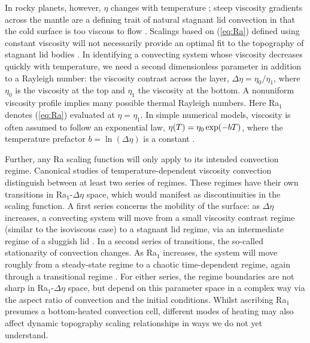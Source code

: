 In rocky planets, however, $\eta$ changes with temperature \citep{karato_rheology_1993}; steep viscosity gradients across the mantle are a defining trait of natural stagnant lid convection in that the cold surface is too viscous to flow \citep{davaille_transient_1993, solomatov_scaling_1995}. Scalings based on (\ref{eq:Ra}) defined using constant viscosity will not necessarily provide an optimal fit to the topography of stagnant lid bodies \citep{sembroni_impact_2017, bodur_impact_2019}. In identifying a convecting system whose viscosity decreases quickly with temperature, we need a second dimensionless parameter in addition to a Rayleigh number: the viscosity contrast across the layer, $\Delta \eta=\eta_0/\eta_1$, where $\eta_0$ is the viscosity at the top and $\eta_1$ the viscosity at the bottom. A nonuniform viscosity profile implies many possible thermal Rayleigh numbers. Here Ra$_1$ denotes (\ref{eq:Ra}) evaluated at $\eta=\eta_1$. In simple numerical models, viscosity is often assumed to follow an exponential law, $\eta(T) = \eta_0 \, {\rm exp}(-b T)$, where the temperature prefactor $b = \ln\left(\Delta \eta\right)$ is a constant \citep{solomatov_scaling_1995}. 

Further, any Ra scaling function will only apply to its intended convection regime. Canonical studies of temperature-dependent viscosity convection distinguish between at least two series of regimes. These regimes have their own transitions in Ra$_1$-$\Delta \eta$ space, which would manifest as discontinuities in the scaling function. %
A first series concerns the mobility of the surface: as $\Delta \eta$ increases, a convecting system will move from a small viscosity contrast regime (similar to the isoviscous case) to a stagnant lid regime, via an intermediate regime of a sluggish lid \citep{solomatov_scaling_1995, moresi_numerical_1995, kameyama_transitions_2000}. In a second series of transitions, the so-called stationarity of convection changes. As Ra$_1$ increases, the system will move roughly from a steady-state regime to a chaotic time-dependent regime, again through a transitional regime \citep{dumoulin_heat_1999, solomatov_scaling_2000}. For either series, the regime boundaries are not sharp in Ra$_1$-$\Delta \eta$ space, but depend on this parameter space in a complex way via the aspect ratio of convection and the initial conditions. Whilst ascribing Ra$_1$ presumes a bottom-heated convection cell, different modes of heating may also affect dynamic topography scaling relationships in ways we do not yet understand. 

